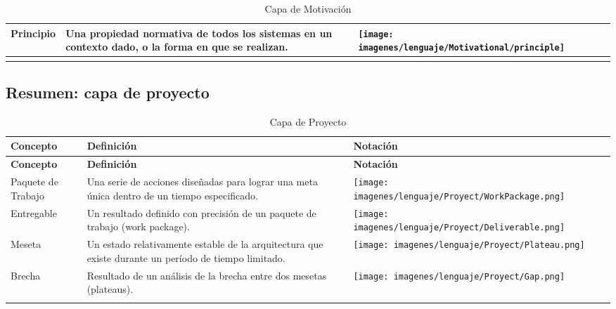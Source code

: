\begin{center}
\begin{longtable}{| >{\centering\arraybackslash}m{3cm} | >{\arraybackslash}m{6cm} | p{4cm} | p{5cm} | p{4cm} |}
		Principio &
		\vspace{1mm} Una propiedad normativa de todos los sistemas en un contexto dado, o la forma en que se realizan.& 
		\texttt{[image: imagenes/lenguaje/Motivational/principle]}  \\ 
		\hline 	
		
	\caption{Capa de Motivación}
	\label{capaMotivacion}
\end{longtable}
\end{center}


\subsection{Resumen: capa de proyecto}
\begin{center}
\begin{longtable}{| >{\centering\arraybackslash}m{3cm} | >{\arraybackslash}m{6cm} | p{4cm} | p{5cm} | p{4cm} |}
	
		\hline
		\textbf{Concepto} &  \centering \textbf{Definición} & \textbf{Notación} \\
		\hline
		\endfirsthead
		
		
		\hline
		\textbf{Concepto} &  \centering \textbf{Definición} & \textbf{Notación} \\
		\hline
		\endhead
		
		Paquete de Trabajo & 
		\vspace{1mm} Una serie de acciones diseñadas para lograr una meta única dentro de un tiempo especificado.&
		\texttt{[image: imagenes/lenguaje/Proyect/WorkPackage.png]}\\ 
		\hline
		
		Entregable & 
		\vspace{1mm} 
		 Un resultado definido con precisión de un paquete de trabajo (work package).& 
		\texttt{[image: imagenes/lenguaje/Proyect/Deliverable.png]}\\ 
		\hline
		
		Meseta &
		\vspace{1mm} Un estado relativamente estable de la arquitectura que existe durante un período de tiempo limitado. &  
		\texttt{[image: imagenes/lenguaje/Proyect/Plateau.png]}\\ 
		\hline
		
		Brecha & 
		\vspace{1mm} Resultado de un análisis de la brecha entre dos mesetas (plateaus).&  
		\texttt{[image: imagenes/lenguaje/Proyect/Gap.png]}  \\ 
		\hline
		\caption{Capa de Proyecto}
	\label{capa-proyecto}
\end{longtable}
\end{center}


